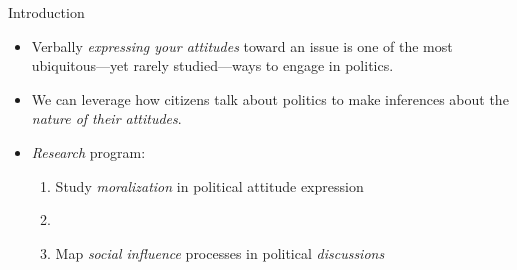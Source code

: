 
\begin{frame}{Introduction}
\begin{itemize}
\item Verbally \emph{expressing your attitudes} toward an issue is one of the most ubiquitous---yet rarely studied---ways to engage in politics.
\item<2-> We can leverage how citizens talk about politics to make inferences about the \emph{nature of their attitudes}.
\vspace{1em}
\vspace{1em}
\item<4-> \emph{Research} program:
\begin{enumerate}
\item<5-> Study \emph{moralization} in political attitude expression
\item {}
\item<7-> Map \emph{social influence} processes in political \emph{discussions}
\end{enumerate}
\end{itemize}
\end{frame}

